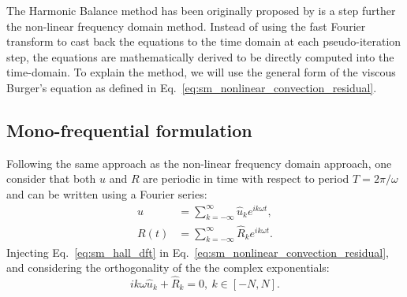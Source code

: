 
The Harmonic Balance method has been originally
 proposed by \citet{Hall2002}
is a step further the non-linear frequency domain method. Instead
of using the fast Fourier transform to cast back the equations
to the time domain at each pseudo-iteration step, 
the equations are mathematically derived to be directly
computed into the time-domain.
To explain the method, we will use the general form of 
the viscous Burger's equation as defined in
Eq.~\ref{eq:sm_nonlinear_convection_residual}.

\subsection{Mono-frequential formulation}

Following the same approach as the non-linear frequency domain approach,
one consider that both $u$ and $R$ are periodic
in time with respect to period $T = 2 \pi / \omega$
and can be written using a Fourier series:
\begin{equation}
	\begin{split}
		u &= \sum_{k=-\infty}^{\infty} \widehat{u}_k e^{i k \omega t}, \\
		R(t) &= \sum_{k=-\infty}^{\infty} \widehat{R}_k e^{i k \omega t}.
		\label{eq:sm_hall_dft}
	\end{split}
\end{equation}
Injecting Eq.~\ref{eq:sm_hall_dft} in 
Eq.~\ref{eq:sm_nonlinear_convection_residual}, and considering
the orthogonality of the the complex exponentials:
\begin{equation}
	i k \omega \widehat{u}_k + \widehat{R}_k = 0, \: k \in [-N, N].
	\label{eq:sm_hall_frequential_eq}
\end{equation}

